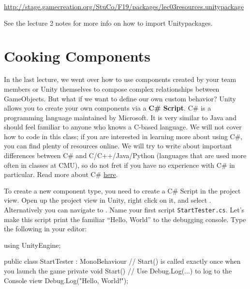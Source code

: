\documentclass[11pt]{article}
\def\StartLineAt#1{\lstset{firstnumber=#1}}
\begin{document}
\begin{center}
\href{http://stage.gamecreation.org/StuCo/F19/packages/lec03resources.unitypackage}{http://stage.gamecreation.org/StuCo/F19/packages/lec03resources.unitypackage}
\end{center}

\noindent See the lecture 2 notes for more info on how to import Unitypackages.

\pagebreak

\section{Cooking Components}

In the last lecture, we went over how to use components created by your team members or Unity 
themselves to compose complex relationships between GameObjects.  But what if we want to define our 
own custom behavior?  Unity allows you to create your own components via a \textbf{C\# Script}.  C\# 
is a programming language maintained by Microsoft.  It is very similar to Java and should feel 
familiar to anyone who knows a C-based language.  We will not cover how to code in this class; if 
you are interested in learning more about using C\#, you can find plenty of resources online.
We will try to write about important differences between C\# and C/C++/Java/Python (languages that
are used more often in classes at CMU), so do not fret if you have no experience with C\# in particular.
Read more about C\# \href{https://docs.microsoft.com/en-us/dotnet/csharp/}{here}.

To create a new component type, you need to create a C\# Script in the project view.  Open up the 
project view in Unity, right click on it, and select .  Alternatively you 
can navigate to .  Name your first script
\lstinline|StartTester.cs|.  Let's make this script print the familiar ``Hello, World'' to the 
debugging console.  Type the following in your editor:

\StartLineAt{1}
\begin{csharp}
using UnityEngine;

public class StartTester : MonoBehaviour
{
    // Start() is called exactly once when you launch the game
    private void Start()
    {
        // Use Debug.Log(...) to log to the Console view
        Debug.Log("Hello, World!");
    }
}
\end{csharp}
\end{document}
